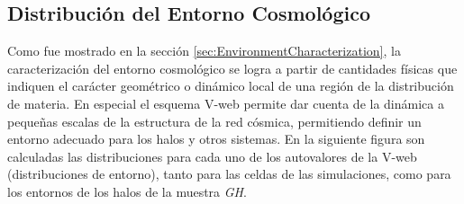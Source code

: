 	\subsection{Distribución del Entorno Cosmológico}
	\label{subsec:Environment_Properties}


Como fue mostrado en la sección \ref{sec:EnvironmentCharacterization}, 
la caracterización del entorno cosmológico se logra a partir de cantidades
físicas que indiquen el carácter geométrico o dinámico local de una región
de la distribución de materia. En especial el esquema V-web permite dar 
cuenta de la dinámica a pequeñas escalas de la estructura de la red cósmica,
permitiendo definir un entorno adecuado para los halos y otros sistemas.
En la siguiente figura son calculadas las distribuciones para cada uno de 
los autovalores de la V-web (distribuciones de entorno), tanto para las 
celdas de las simulaciones, como para los entornos de los halos de la 
muestra \textit{GH}.


